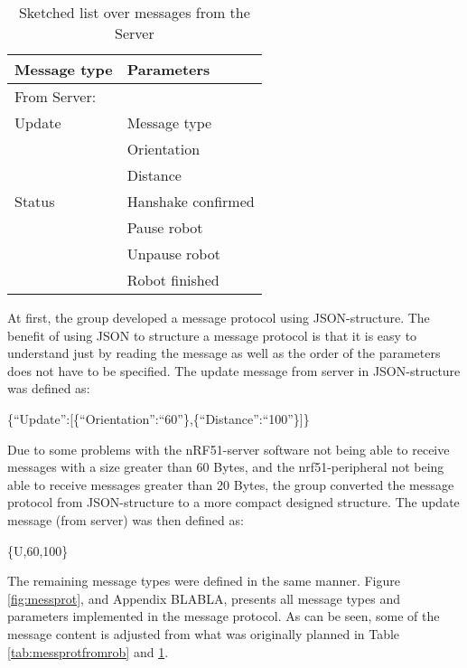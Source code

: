 \begin{table}[ht]
\begin{center}
 \begin{tabular}{|l | l|} 
 \hline
 Message type       &    Parameters \\
 \hline
 \hline
 From Server: & \\
 \hline
 Update              &   Message type \\
                    &   Orientation \\
                    &   Distance \\
 \hline
 Status                &   Hanshake confirmed \\
                    &   Pause robot \\
                    &   Unpause robot \\
                    &   Robot finished \\
 \hline
\end{tabular}
\end{center}
\caption{Sketched list over messages from the Server}
\label{tab:messprotfromser}
\end{table}

At first, the group developed a message protocol using JSON-structure. The benefit of using JSON to structure a message protocol is that it is easy to understand just by reading the message as well as the order of the parameters does not have to be specified. The update message from server in JSON-structure was defined as:

\{``Update'':[\{``Orientation'':``60''\},\{``Distance'':``100''\}]\}

Due to some problems with the nRF51-server software not being able to receive messages with a size greater than 60 Bytes, and the nrf51-peripheral not being able to receive messages greater than 20 Bytes, the group converted the message protocol from JSON-structure to a more compact designed structure. The update message (from server) was then defined as:

\{U,60,100\}

The remaining message types were defined in the same manner. Figure \ref{fig:messprot}, and Appendix BLABLA, presents all message types and parameters implemented in the message protocol. As can be seen, some of the message content is adjusted from what was originally planned in Table \ref{tab:messprotfromrob} and \ref{tab:messprotfromser}. 

